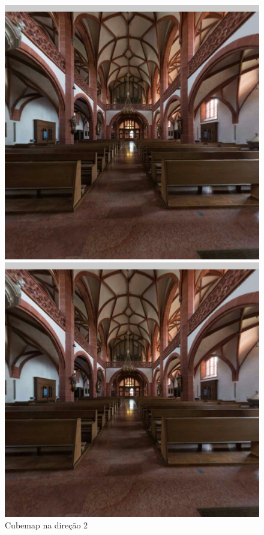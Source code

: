 \documentclass[conference]{IEEEtran}
\begin{document}
\begin{figure}[!tbp]
  \centering
  \begin{minipage}[b]{0.3\textwidth}
    \includegraphics[width=1.1\textwidth]{../images/screenshots/Screenshot_5_Equi2Cube}
    \caption{Cubemap na direção 2}
    \label{fig:sphere_direction_0}
  \end{minipage}
  \hfill
  \begin{minipage}[b]{0.3\textwidth}
    \centering
    \includegraphics[width=1.1\textwidth]{../images/screenshots/Screenshot_5_Skybox}

\end{minipage}
\end{figure}
\end{document}
